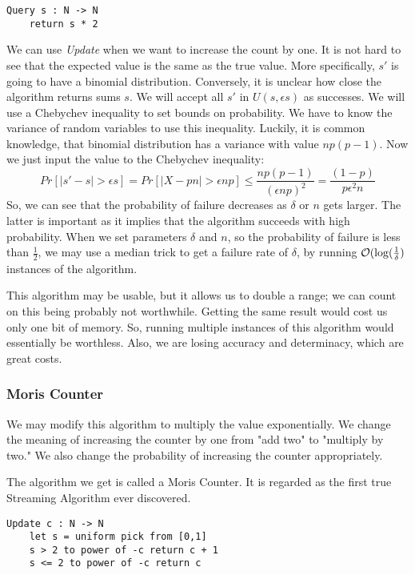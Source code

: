 \begin{lstlisting}
Query s : N -> N
    return s * 2
\end{lstlisting}
We can use \textit{Update} when we want to increase the count by one. It is not hard to see that the expected value is the same as the true value. More specifically, $s'$ is going to have a binomial distribution. Conversely, it is unclear how close the algorithm returns sums $s$. We will accept all $s'$ in $U(s, \epsilon s)$ as successes. We will use a Chebychev inequality to set bounds on probability. We have to know the variance of random variables to use this inequality. Luckily, it is common knowledge, that binomial distribution has a variance with value $np(p-1)$.
Now we just input the value to the Chebychev inequality:
$$
Pr[|s' - s| > \epsilon s]= Pr[|X-pn| > \epsilon np] \leq \frac{np(p-1)}{(\epsilon np)^2} = \frac{(1-p)}{p\epsilon^2n}
$$
So, we can see that the probability of failure decreases as $\delta$ or $n$ gets larger. The latter is important as it implies that the algorithm succeeds with high probability. When we set parameters $\delta$ and $n$, so the probability of failure is less than $\frac{1}{2}$, we may use a median trick to get a failure rate of $\delta$, by running $\mathcal{O}(\log(\frac{1}{\delta})$ instances of the algorithm. 

This algorithm may be usable, but it allows us to double a range; we can count on this being probably not worthwhile. Getting the same result would cost us only one bit of memory. So, running multiple instances of this algorithm would essentially be worthless. Also, we are losing accuracy and determinacy, which are great costs. 

 

\subsubsection{Moris Counter}

We may modify this algorithm to multiply the value exponentially. We change the meaning of increasing the counter by one from "add two" to "multiply by two." We also change the probability of increasing the counter appropriately.

The algorithm we get is called a Moris Counter. It is regarded as the first true Streaming Algorithm ever discovered.

\begin{lstlisting}
Update c : N -> N
    let s = uniform pick from [0,1]
    s > 2 to power of -c return c + 1
    s <= 2 to power of -c return c
\end{lstlisting}

